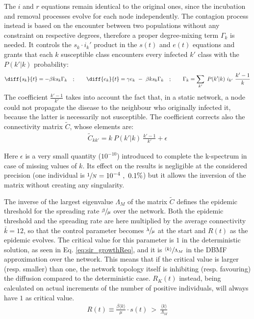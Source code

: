 \documentclass[DIV=12, BCOR=0pt]{scrartcl}  %
\begin{document}
  The $i$ and $r$ equations remain identical to the original ones, since the incubation and removal processes evolve for each node independently. The contagion process instead is based on the encounter between two populations without any constraint on respective degrees, therefore a proper degree-mixing term $\Gamma_k$ is needed. It controls the $s_k \cdot i_k'$ product in the $s(t)$ and $e(t)$ equations and grants that each $k$ susceptible class encounters every infected $k'$ class with the $P(k'|k)$ probability:
  \begin{align}
  	\diff{s_{k}}{t} = - \beta k s_{k} \Gamma_{k} \quad;  \qquad 	\diff{e_{k}}{t} =  \gamma e_{k} \ - \ \beta k s_{k} \Gamma_{k} \quad; \qquad	\Gamma_{k} = \sum_{k'} \ P(k'|k) \ i_{k'}  \ \frac{k' - 1}{k}
  	\label{eq:seir_dbmf}
  \end{align}
%  
  The coefficient $\frac{k' - 1}{k'}$ takes into account the fact that, in a static network, a node could not propagate the disease to the neighbour who originally infected it, because the latter is necessarily not susceptible. %
  The coefficient corrects also the connectivity matrix $\tilde{C}$, whose elements are:  
  \begin{align}
		\tilde{C}_{kk'} = k \ P(k'|k) \ \frac{k' - 1}{k'} + \epsilon
  \end{align}

	Here $\epsilon$ is a very small quantity ($10^{-10}$) introduced to complete the k-spectrum in case of missing values of $k$. Its effect on the results is negligible at the considered precision (one individual is $ \sfrac{1}{N} = 10^{-4} \ , \ 0.1 \%$) but it allows the inversion of the matrix without creating any singularity.

  The inverse of the largest eigenvalue $\Lambda_M$ of the matrix $\tilde{C}$ defines the epidemic threshold for the spreading rate $\sfrac{\beta}{\mu}$ over the network. Both the epidemic threshold and the spreading rate are here multiplied by the average connectivity $\bar{k} = 12$, so that the control parameter becomes $\sfrac{\lambda}{\mu}$ at the start and $R(t)$ as the epidemic evolves. The critical value for this parameter is $1$ in the deterministic solution, as seen in Eq. \ref{eq:sir_growthReq}, and it is $\sfrac{\langle k \rangle}{\Lambda_M}$ in the DBMF approximation over the network. This means that if the critical value is larger (resp. smaller) than one, the network topology itself is inhibiting (resp. favouring) the diffusion compared to the deterministic case. $R_K(t)$ instead, being calculated on actual increments of the number of positive individuals, will always have $1$ as critical value.
  \begin{align}
		 R(t) \equiv \frac{\beta \langle k \rangle }{\mu} \cdot s(t) \ > \ \frac{\langle k \rangle}{\Lambda_M}
  \end{align}
  
\end{document}
